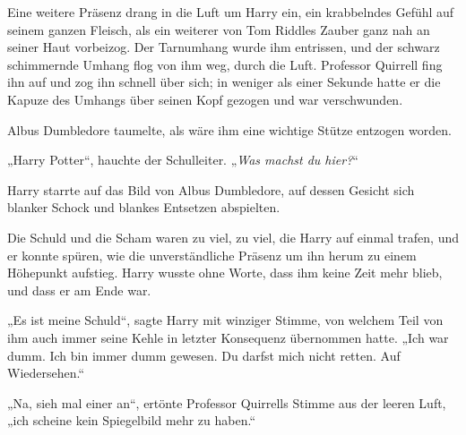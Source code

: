 Eine weitere Präsenz drang in die Luft um Harry ein, ein krabbelndes Gefühl auf seinem ganzen Fleisch, als ein weiterer von Tom Riddles Zauber ganz nah an seiner Haut vorbeizog. Der Tarnumhang wurde ihm entrissen, und der schwarz schimmernde Umhang flog von ihm weg, durch die Luft.
Professor Quirrell fing ihn auf und zog ihn schnell über sich; in weniger als einer Sekunde hatte er die Kapuze des Umhangs über seinen Kopf gezogen und war verschwunden.

Albus Dumbledore taumelte, als wäre ihm eine wichtige Stütze entzogen worden.

„Harry Potter“, hauchte der Schulleiter. „\emph{Was machst du hier?}“

Harry starrte auf das Bild von Albus Dumbledore, auf dessen Gesicht sich blanker Schock und blankes Entsetzen abspielten.

Die Schuld und die Scham waren zu viel, zu viel, die Harry auf einmal trafen, und er konnte spüren, wie die unverständliche Präsenz um ihn herum zu einem Höhepunkt aufstieg. Harry wusste ohne Worte, dass ihm keine Zeit mehr blieb, und dass er am Ende war.

„Es ist meine Schuld“, sagte Harry mit winziger Stimme, von welchem Teil von ihm auch immer seine Kehle in letzter Konsequenz übernommen hatte. „Ich war dumm. Ich bin immer dumm gewesen. Du darfst mich nicht retten. Auf Wiedersehen.“

„Na, sieh mal einer an“, ertönte Professor Quirrells Stimme aus der leeren Luft, „ich scheine kein Spiegelbild mehr zu haben.“

